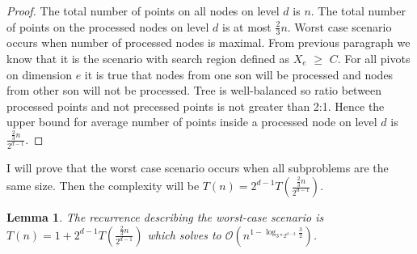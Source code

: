 \documentclass[10pt,a4paper]{article}
\newtheorem{lemma}{Lemma}
\newcommand{\Oh}{\mathcal{O}}
\begin{document}
\begin{proof}

The total number of points on all nodes on level $d$ is $n$. The total number of points on the processed nodes on level $d$ is at most $\frac{2}{3}n$. Worst case scenario occurs when number of processed nodes is maximal. From previous paragraph we know that it is the scenario with search region defined as $X_e$ $\geq$ $C$. For all pivots on dimension $e$ it is true that nodes from one son will be processed and nodes from other son will not be processed. Tree is well-balanced so ratio between processed points and not precessed points is not greater than 2:1. Hence the upper bound for average number of points inside a processed node on level $d$ is $\frac{\frac{2}{3}n}{2^{d-1}}$.

\end{proof}

I will prove that the worst case scenario occurs when all subproblems are the same size. Then the complexity will be $T(n)=2^{d-1}T(\frac{\frac{2}{3}n}{2^{d-1}})$.

\begin{lemma}\label{lem:5}
The recurrence describing the worst-case scenario is $T(n)=1+2^{d-1}T(\frac{\frac{2}{3}n}{2^{d-1}})$ which solves to $\Oh(n^{1 - \log_{3*2^{d-2}}{\frac{3}{2}}})$.
\end{lemma}
\end{document}
